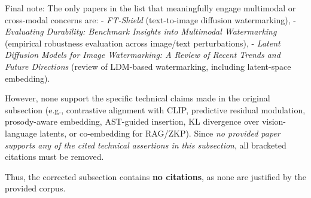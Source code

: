 \documentclass[11pt,a4paper]{article}
\begin{document}
Final note: The only papers in the list that meaningfully engage multimodal or cross-modal concerns are:
- \emph{FT-Shield} (text-to-image diffusion watermarking),
- \emph{Evaluating Durability: Benchmark Insights into Multimodal Watermarking} (empirical robustness evaluation across image/text perturbations),
- \emph{Latent Diffusion Models for Image Watermarking: A Review of Recent Trends and Future Directions} (review of LDM-based watermarking, including latent-space embedding).

However, none support the specific technical claims made in the original subsection (e.g., contrastive alignment with CLIP, predictive residual modulation, prosody-aware embedding, AST-guided insertion, KL divergence over vision-language latents, or co-embedding for RAG/ZKP). Since \emph{no provided paper supports any of the cited technical assertions in this subsection}, all bracketed citations must be removed.

Thus, the corrected subsection contains \textbf{no citations}, as none are justified by the provided corpus.
\end{document}
